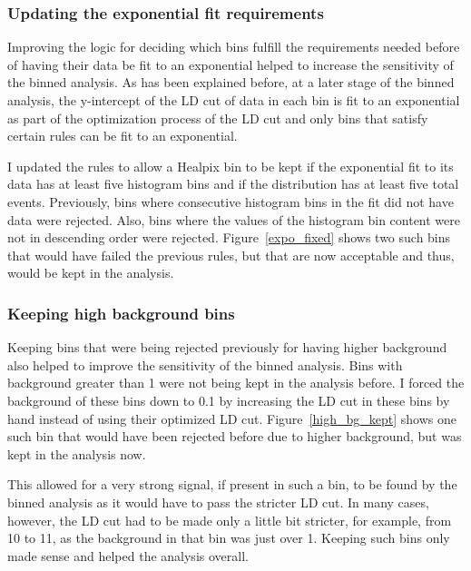 \subsubsection{Updating the exponential fit requirements}

Improving the logic for deciding which bins fulfill the requirements needed before of having their data be fit to an exponential helped to increase the sensitivity of the binned analysis. As has been explained before, at a later stage of the binned analysis, the y-intercept of the LD cut of data in each bin is fit to an exponential as part of the optimization process of the LD cut and only bins that satisfy certain rules can be fit to an exponential. 

I updated the rules to allow a Healpix bin to be kept if the exponential fit to its data has at least five histogram bins and if the distribution has at least five total events. Previously, bins where consecutive histogram bins in the fit did not have data were rejected. Also, bins where the values of the histogram bin content were not in descending order were rejected. Figure~\ref{expo_fixed} shows two such bins that would have failed the previous rules, but that are now acceptable and thus, would be kept in the analysis. 

\subsubsection{Keeping high background bins}

Keeping bins that were being rejected previously for having higher background also helped to improve the sensitivity of the binned analysis. Bins with background greater than 1 were not being kept in the analysis before. I forced the background of these bins down to 0.1 by increasing the LD cut in these bins by hand instead of using their optimized LD cut. Figure~\ref{high_bg_kept} shows one such bin that would have been rejected before due to higher background, but was kept in the analysis now. 

This allowed for a very strong signal, if present in such a bin, to be found by the binned analysis as it would have to pass the stricter LD cut. In many cases, however, the LD cut had to be made only a little bit stricter, for example, from 10 to 11, as the background in that bin was just over 1. Keeping such bins only made sense and helped the analysis overall. 


